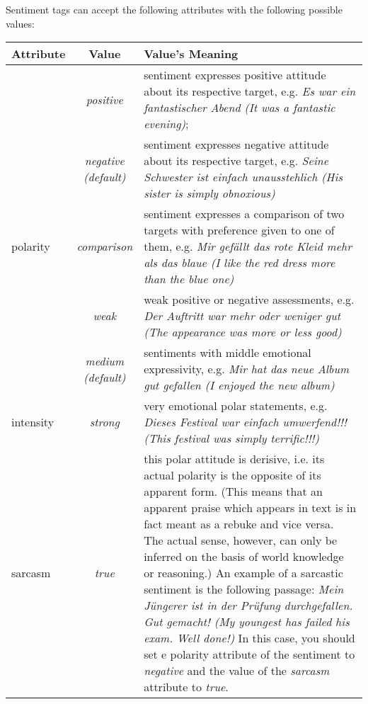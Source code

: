 \documentclass[11pt,a4paper]{article}
\newlength\clmnwidth
\begin{document}
Sentiment tags can accept the following attributes with the following
possible values:
\begin{center}
  \begin{tabular}{|l|c|p{\clmnwidth}|}\hline
    Attribute & Value & Value's Meaning\\\hline

    & \textit{positive} & sentiment expresses positive attitude about
    its respective target, e.g. \textit{Es war ein fantastischer Abend
      (It was a fantastic evening)};\\\cline{2-3}

    & \textit{negative\newline(default)} & sentiment expresses
    negative attitude about its respective target, e.g. \textit{Seine
      Schwester ist einfach unausstehlich (His sister is simply
      obnoxious)}\\\cline{2-3}

    \multirow{-3}{*}{polarity} & \textit{comparison} & sentiment
    expresses a comparison of two targets with preference given to one
    of them, e.g. \textit{Mir gef\"allt das rote Kleid mehr als das
      blaue (I like the red dress more than the blue one)}\\\hline


    & \textit{weak} & weak positive or
    negative assessments, e.g. \textit{Der Auftritt war mehr oder
      weniger gut (The appearance was more or less good)}\\\cline{2-3}

    & \textit{medium\newline(default)} & sentiments with middle
    emotional expressivity, e.g. \textit{Mir hat das neue Album gut
      gefallen (I enjoyed the new album)}\\\cline{2-3}

    \multirow{-3}{*}{intensity} & \textit{strong} & very emotional
    polar statements, e.g. \textit{Dieses Festival war einfach
      umwerfend!!! (This festival was simply terrific!!!)}\\\hline

    \multirow{2}{*}{sarcasm} & \textit{true} & this polar attitude is
    derisive, i.e. its actual polarity is the opposite of its apparent
    form. (This means that an apparent praise which appears in text is
    in fact meant as a rebuke and vice versa. The actual sense,
    however, can only be inferred on the basis of world knowledge or
    reasoning.)  An example of a sarcastic sentiment is the following
    passage: \textit{Mein J\"ungerer ist in der Pr\"ufung
      durchgefallen.  Gut gemacht! (My youngest has failed his exam.
      Well done!)}  In this case, you should set e polarity attribute
    of the sentiment to \textit{negative} and the value of the
    \textit{sarcasm} attribute to \textit{true}.\\\cline{2-3}


\end{tabular}
\end{center}
\end{document}
